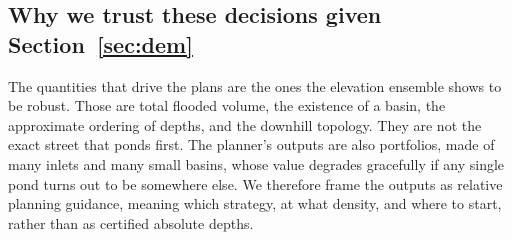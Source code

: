\subsection{Why we trust these decisions given Section~\ref{sec:dem}}
The quantities that drive the plans are the ones the elevation ensemble shows to be robust. Those
are total flooded volume, the existence of a basin, the approximate ordering of depths, and the
downhill topology. They are not the exact street that ponds first. The planner's outputs are also
portfolios, made of many inlets and many small basins, whose value degrades gracefully if any single
pond turns out to be somewhere else. We therefore frame the outputs as relative planning guidance,
meaning which strategy, at what density, and where to start, rather than as certified absolute
depths.
